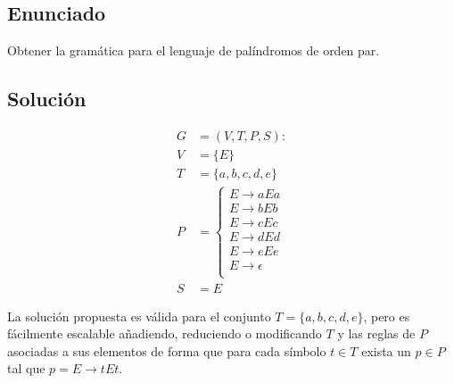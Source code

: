 \chapter{}

\section{Enunciado}

Obtener la gramática para el lenguaje de palíndromos de orden par.

\section{Solución}

\begin{align*}
	G &= (V, T, P, S) : \\
	V &= \{E\} \\
	T &= \{a, b, c, d, e\} \\
	P &=
		\begin{cases}
			E \rightarrow aEa      \\
			E \rightarrow bEb      \\
			E \rightarrow cEc      \\
			E \rightarrow dEd      \\
			E \rightarrow eEe      \\
			E \rightarrow \epsilon \\
 		\end{cases} \\
	S &= E
\end{align*}

La solución propuesta es válida para el conjunto $T = \{a, b, c, d, e\}$, pero es fácilmente escalable añadiendo, reduciendo o modificando $T$ y las reglas de $P$ asociadas a sus elementos de forma que para cada símbolo $t \in T$ exista un $p \in P$ tal que $p = E \rightarrow tEt$.
